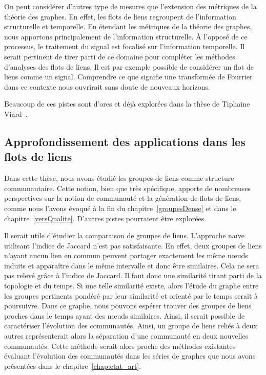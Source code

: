 \bigskip

On peut considérer d'autres type de mesures que l'extension des métriques de la théorie des graphes.
En effet, les flots de liens regroupent de l'information structurelle et temporelle.
En étendant les métriques de la théorie des graphes, nous apportons principalement de l'information structurelle.
\`A l'opposé de ce processus, le traitement du signal est focalisé sur l'information temporelle.
Il serait pertinent de tirer parti de ce domaine pour compléter les méthodes d'analyses des flots de liens.
Il est par exemple possible de considérer un flot de liens comme un signal.
Comprendre ce que signifie une transformée de Fourrier dans ce contexte nous ouvrirait sans doute de nouveaux horizons.

\bigskip

Beaucoup de ces pistes sont d'ores et déjà explorées dans la thèse de Tiphaine Viard~\cite{viard2016flots}.

\subsection{Approfondissement des applications dans les flots de liens}
Dans cette thèse, nous avons étudié les groupes de liens comme structure communautaire.
Cette notion, bien que très spécifique, apporte de nombreuses perspectives sur la notion de communauté et la génération de flots de liens, comme nous l'avons évoqué à la fin du chapitre~\ref{groupesDense} et dans le chapitre~\ref{versQualite}.
D'autres pistes pourraient être explorées.

\bigskip

Il serait utile d'étudier la comparaison de groupes de liens.
L'approche naïve utilisant l'indice de Jaccard n'est pas satisfaisante.
En effet, deux groupes de liens n'ayant aucun lien en commun peuvent partager exactement les même n\oe{}uds induits et apparaître dans le même intervalle et donc être similaires.
Cela ne sera pas relevé grâce à l'indice de Jaccard.
Il faut donc une similarité tirant parti de la topologie et du temps.
Si une telle similarité existe, alors l'étude du graphe entre les groupes pertinents pondéré par leur similarité et orienté par le temps serait à poursuivre.
Dans ce graphe, nous pouvons espérer trouver des groupes de liens proches dans le temps ayant des n\oe{}uds similaires.
Ainsi, il serait possible de caractériser l'évolution des communautés.
Ainsi, un groupe de liens reliés à deux autres représenterait alors la séparation d'une communauté en deux nouvelles communautés.
Cette méthode serait alors proche des méthodes existantes évaluant l'évolution des communautés dans les séries de graphes que nous avons présentées dans le chapitre~\ref{chap:etat_art}.

